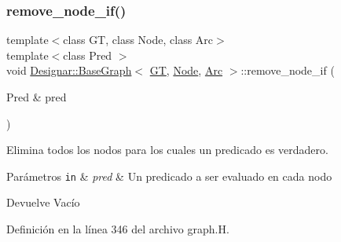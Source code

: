 \mbox{\label{class_designar_1_1_base_graph_aae56ca6b3b936835d07275f2ceb4b0d1}} 
\subsubsection{\texorpdfstring{remove\+\_\+node\+\_\+if()}{remove\_node\_if()}\hspace{0.1cm}{\footnotesize\ttfamily [1/2]}}
{\footnotesize\ttfamily template$<$class GT, class Node, class Arc$>$ \\
template$<$class Pred $>$ \\
void \hyperlink{class_designar_1_1_base_graph}{Designar\+::\+Base\+Graph}$<$ \hyperlink{demo-buildgraph_8_c_a3001c40d2c31ca87ed96cd7d1334a55e}{GT}, \hyperlink{namespace_designar_a5af326c65aa2bd26b26c410f2030d09e}{Node}, \hyperlink{namespace_designar_a3f55fb5513d62ff47cbc8f72b8e95d6f}{Arc} $>$\+::remove\+\_\+node\+\_\+if (\begin{DoxyParamCaption}\item[{Pred \&}]{pred }\end{DoxyParamCaption})\hspace{0.3cm}{\ttfamily [inline]}}



Elimina todos los nodos para los cuales un predicado es verdadero. 


\begin{DoxyParams}[1]{Parámetros}
\mbox{\tt in}  & {\em pred} & Un predicado a ser evaluado en cada nodo \\
\hline
\end{DoxyParams}
\begin{DoxyReturn}{Devuelve}
Vacío 
\end{DoxyReturn}


Definición en la línea 346 del archivo graph.\+H.

\mbox{\label{class_designar_1_1_base_graph_a6e63659d272255254f6abc29c1e09724}} 
